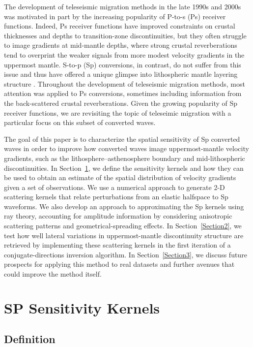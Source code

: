 \documentclass[referee]{gji}
\begin{document}
The development of teleseismic migration methods in the late 1990s and 2000s was motivated in part by the increasing popularity of P-to-s (Ps) receiver functions.  Indeed, Ps receiver functions have improved constraints on crustal thicknesses and depths to transition-zone discontinuities, but they often struggle to image gradients at mid-mantle depths, where strong crustal reverberations tend to overprint the weaker signals from more modest velocity gradients in the uppermost mantle.  S-to-p (Sp) conversions, in contrast, do not suffer from this issue and thus have offered a unique glimpse into lithospheric mantle layering structure \citep{Yuan2006}.  Throughout the development of teleseismic migration methods, most attention was applied to Ps conversions, sometimes including information from the back-scattered crustal reverberations.  Given the growing popularity of Sp receiver functions, we are revisiting the topic of teleseimic migration with a particular focus on this subset of converted waves.

The goal of this paper is to characterize the spatial sensitivity of Sp converted waves in order to improve how converted waves image uppermost-mantle velocity gradients, such as the lithosphere--asthenosphere boundary and mid-lithospheric discontinuities.  In Section~\ref{Section1}, we define the sensitivity kernels and how they can be used to obtain an estimate of the spatial distribution of velocity gradients given a set of observations.  We use a numerical approach to generate 2-D scattering kernels that relate perturbations from an elastic halfspace to Sp waveforms. We also develop an approach to approximating the Sp kernels using ray theory, accounting for amplitude information by considering anisotropic scattering patterns and geometrical-spreading effects.
In Section~\ref{Section2}, we test how well lateral variations in uppermost-mantle discontinuity structure are retrieved by implementing these scattering kernels in the first iteration of a conjugate-directions inversion algorithm.  
In Section~\ref{Section3}, we discuss future prospects for applying this method to real datasets and further avenues that could improve the method itself.

\section{SP Sensitivity Kernels}
\label{Section1}

\subsection{Definition}
\end{document}
